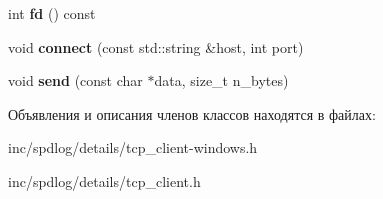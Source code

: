 \begin{DoxyCompactItemize}
int {\bfseries fd} () const
\item 
\mbox{\label{classspdlog_1_1details_1_1tcp__client_a49ee8323af98d73af42e4c76ebb13f2d}} 
void {\bfseries connect} (const std\+::string \&host, int port)
\item 
\mbox{\label{classspdlog_1_1details_1_1tcp__client_a822dbb5a77626f1b16f953f5a41d2756}} 
void {\bfseries send} (const char $\ast$data, size\+\_\+t n\+\_\+bytes)
\end{DoxyCompactItemize}


Объявления и описания членов классов находятся в файлах\+:\begin{DoxyCompactItemize}
\item 
inc/spdlog/details/tcp\+\_\+client-\/windows.\+h\item 
inc/spdlog/details/tcp\+\_\+client.\+h\end{DoxyCompactItemize}
